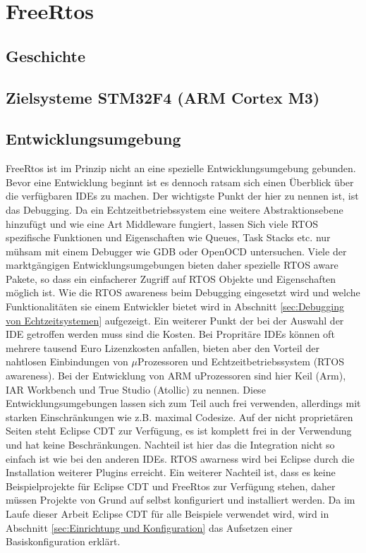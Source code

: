 \documentclass[ngerman]{seminarvorlage}
\begin{document}
\section{FreeRtos} 
\subsection{Geschichte}
\subsection{Zielsysteme STM32F4 (ARM Cortex M3)}
\subsection{Entwicklungsumgebung}
FreeRtos ist im Prinzip nicht an eine spezielle Entwicklungs\-umgebung gebunden. Bevor eine Ent\-wicklung beginnt ist es dennoch rat\-sam sich einen Über\-blick über die verfügbaren IDEs zu machen. Der wichtigste Punkt der hier zu nennen ist, ist das Debugging. Da ein Echtzeitbetriebssystem eine weitere Abstraktionsebene hinzufügt und wie eine Art Middleware fungiert, lassen Sich viele RTOS spezifische Funktionen und Eigenschaften wie Queues, Task Stacks etc. nur mühsam mit einem Debugger wie GDB oder OpenOCD untersuchen. Viele der marktgängigen Entwicklungsumgebungen bieten daher spezielle RTOS aware Pakete, so dass ein einfacherer Zugriff auf RTOS Objekte und Eigenschaften möglich ist. Wie die RTOS awareness beim Debugging eingesetzt wird und welche Funktionalitäten sie einem Entwickler bietet wird in Abschnitt \ref{sec:Debugging von Echtzeitsystemen} aufgezeigt. Ein weiterer Punkt der bei der Auswahl der IDE getroffen werden muss sind die Kosten. Bei Propritäre IDEs können oft mehrere tausend Euro Lizenzkosten anfallen, bieten aber den Vorteil der nahtlosen Einbindungen von $\mu$Prozessoren und Echtzeitbetriebssystem (RTOS awareness). Bei der Entwicklung von ARM uProzessoren sind hier Keil (Arm), IAR Workbench und True Studio (Atollic) zu nennen. Diese Entwicklungsumgebungen lassen sich zum Teil auch frei verwenden, allerdings mit starken Einschränkungen wie z.B. maximal Codesize. Auf der nicht proprietären Seiten steht Eclipse CDT zur Verfügung, es ist komplett frei in der Verwendung und hat keine Beschränkungen. Nachteil ist hier das die Integration nicht so einfach ist wie bei den anderen IDEs. RTOS awarness wird bei Eclipse durch die Installation weiterer Plugins erreicht. Ein weiterer Nachteil ist, dass es keine Beispielprojekte für Eclipse CDT und FreeRtos zur Verfügung stehen, daher müssen Projekte von Grund auf selbst konfiguriert und installiert werden. Da im Laufe dieser Arbeit Eclipse CDT für alle Beispiele verwendet wird, wird in Abschnitt \ref{sec:Einrichtung und Konfiguration} das Aufsetzen einer Basiskonfiguration erklärt.       
\end{document}
